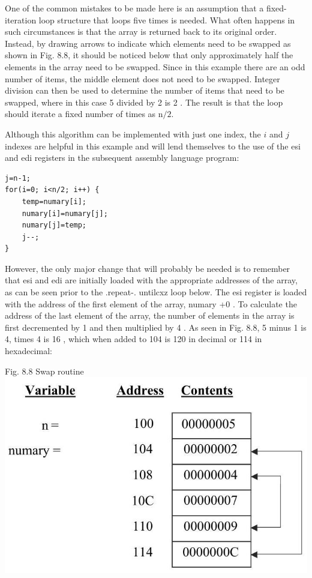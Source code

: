\documentclass[10pt]{article}
\begin{document}
One of the common mistakes to be made here is an assumption that a fixed-iteration loop structure that loops five times is needed. What often happens in such circumstances is that the array is returned back to its original order. Instead, by drawing arrows to indicate which elements need to be swapped as shown in Fig. 8.8, it should be noticed below that only approximately half the elements in the array need to be swapped. Since in this example there are an odd number of items, the middle element does not need to be swapped. Integer division can then be used to determine the number of items that need to be swapped, where in this case 5 divided by 2 is 2 . The result is that the loop should iterate a fixed number of times as $\mathrm{n} / 2$.

Although this algorithm can be implemented with just one index, the $i$ and $j$ indexes are helpful in this example and will lend themselves to the use of the esi and edi registers in the subsequent assembly language program:

\begin{verbatim}
j=n-1;
for(i=0; i<n/2; i++) {
    temp=numary[i];
    numary[i]=numary[j];
    numary[j]=temp;
    j--;
}
\end{verbatim}

However, the only major change that will probably be needed is to remember that esi and edi are initially loaded with the appropriate addresses of the array, as can be seen prior to the .repeat-. untilcxz loop below. The esi register is loaded with the address of the first element of the array, numary +0 . To calculate the address of the last element of the array, the number of elements in the array is first decremented by 1 and then multiplied by 4 . As seen in Fig. 8.8, 5 minus 1 is 4, times 4 is 16 , which when added to 104 is 120 in decimal or 114 in hexadecimal:

Fig. 8.8 Swap routine\\
\includegraphics[max width=\textwidth, center]{2025_03_24_ebe50cc223a6fbc49eecg-184}
\end{document}
